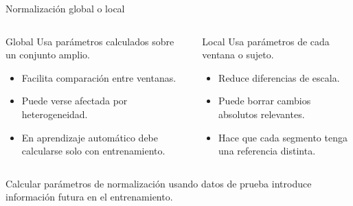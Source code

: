 \documentclass[
  ignorenonframetext,
  aspectratio=169,
  spanish,
  professionalfonts]{beamer}
\providecommand{\tightlist}{%
  \setlength{\itemsep}{0pt}\setlength{\parskip}{0pt}}
\begin{document}
\begin{frame}{Normalización global o local}
\protect{}\label{normalizaciuxf3n-global-o-local}
\begin{columns}[T]
\begin{column}{0.48\linewidth}
\begin{block}{Global}
\protect{}\label{global}
Usa parámetros calculados sobre un conjunto amplio.

\begin{itemize}
\tightlist
\item
  Facilita comparación entre ventanas.
\item
  Puede verse afectada por heterogeneidad.
\item
  En aprendizaje automático debe calcularse solo con entrenamiento.
\end{itemize}
\end{block}
\end{column}

\begin{column}{0.48\linewidth}
\begin{block}{Local}
\protect{}\label{local}
Usa parámetros de cada ventana o sujeto.

\begin{itemize}
\tightlist
\item
  Reduce diferencias de escala.
\item
  Puede borrar cambios absolutos relevantes.
\item
  Hace que cada segmento tenga una referencia distinta.
\end{itemize}
\end{block}
\end{column}
\end{columns}

\begin{tcolorbox}[enhanced jigsaw, arc=.35mm, bottomrule=.15mm, bottomtitle=1mm, breakable, colback=white, colbacktitle=quarto-callout-caution-color!10!white, colframe=quarto-callout-caution-color-frame, coltitle=black, left=2mm, leftrule=.75mm, opacityback=0, opacitybacktitle=0.6, rightrule=.15mm, title={Fuga de información}, titlerule=0mm, toprule=.15mm, toptitle=1mm]

Calcular parámetros de normalización usando datos de prueba introduce
información futura en el entrenamiento.

\end{tcolorbox}
\end{frame}
\end{document}

